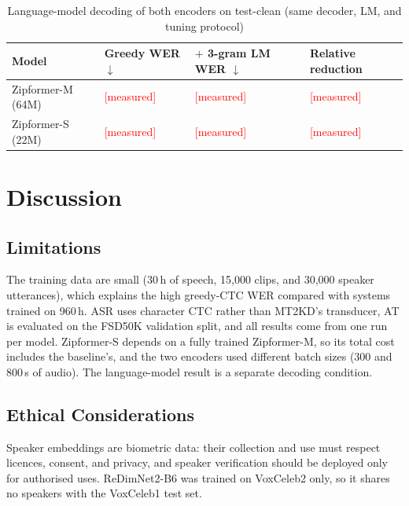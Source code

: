 \documentclass[lettersize,journal]{IEEEtran}
\newcommand{\ph}[1]{\textcolor{red}{[#1]}}          %
\begin{document}
\begin{table}[!htbp]
  \caption{Language-model decoding of both encoders on test-clean (same decoder, LM, and tuning protocol)}
  \label{tab:lm_both}
  \centering
  \footnotesize
  \setlength{\tabcolsep}{3pt}
  \begin{tabular}{L{2.0cm}L{1.5cm}L{1.9cm}L{1.6cm}}
    \toprule
    Model & Greedy WER $\downarrow$ & $+$ 3-gram LM WER $\downarrow$ & Relative reduction \\
    \midrule
    Zipformer-M (64M) & \ph{measured} & \ph{measured} & \ph{measured} \\
    Zipformer-S (22M) & \ph{measured} & \ph{measured} & \ph{measured} \\
    \bottomrule
  \end{tabular}
\end{table}

\section{Discussion}\label{sec:discussion}

\subsection{Limitations}
The training data are small (30\,h of speech, 15,000 clips, and 30,000 speaker utterances), which explains the high
greedy-CTC WER compared with systems trained on 960\,h. ASR uses character CTC rather than MT2KD's transducer, AT is
evaluated on the FSD50K validation split, and all results come from one run per model. Zipformer-S depends on a fully
trained Zipformer-M, so its total cost includes the baseline's, and the two encoders used different batch sizes (300
and 800\,s of audio). The language-model result is a separate decoding condition.

\subsection{Ethical Considerations}
Speaker embeddings are biometric data: their collection and use must respect licences, consent, and privacy, and
speaker verification should be deployed only for authorised uses. ReDimNet2-B6 was trained on VoxCeleb2 only, so it
shares no speakers with the VoxCeleb1 test set.
\end{document}
